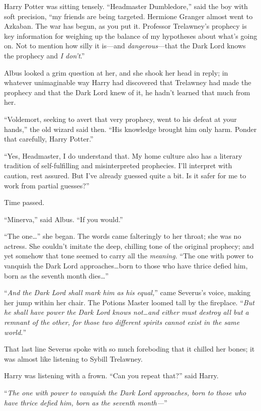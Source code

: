 Harry Potter was sitting tensely. “Headmaster Dumbledore,” said the boy with soft precision, “my friends are being targeted. Hermione Granger almost went to Azkaban. The war has begun, as you put it. Professor Trelawney’s prophecy is key information for weighing up the balance of my hypotheses about what’s going on. Not to mention how silly it is—and \emph{dangerous}—that the Dark Lord knows the prophecy and \emph{I don’t}.”

Albus looked a grim question at her, and she shook her head in reply; in whatever unimaginable way Harry had discovered that Trelawney had made the prophecy and that the Dark Lord knew of it, he hadn’t learned that much from her.

“Voldemort, seeking to avert that very prophecy, went to his defeat at your hands,” the old wizard said then. “His knowledge brought him only harm. Ponder that carefully, Harry Potter.”

“Yes, Headmaster, I do understand that. My home culture also has a literary tradition of self-fulfilling and misinterpreted prophecies. I’ll interpret with caution, rest assured. But I’ve already guessed quite a bit. Is it safer for me to work from partial guesses?”

Time passed.

“Minerva,” said Albus. “If you would.”

“The one…” she began. The words came falteringly to her throat; she was no actress. She couldn’t imitate the deep, chilling tone of the original prophecy; and yet somehow that tone seemed to carry all the \emph{meaning.} “The one with power to vanquish the Dark Lord approaches…born to those who have thrice defied him, born as the seventh month dies…”

“\emph{And the Dark Lord shall mark him as his equal,}” came Severus’s voice, making her jump within her chair. The Potions Master loomed tall by the fireplace. “\emph{But he shall have power the Dark Lord knows not…and either must destroy all but a remnant of the other, for those two different spirits cannot exist in the same world.}”

That last line Severus spoke with so much foreboding that it chilled her bones; it was almost like listening to Sybill Trelawney.

Harry was listening with a frown. “Can you repeat that?” said Harry.

“\emph{The one with power to vanquish the Dark Lord approaches, born to those who have thrice defied him, born as the seventh month—}”

